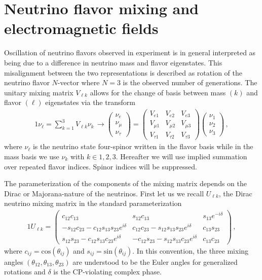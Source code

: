 \documentclass{ws-ijmpa}
\begin{document}
\section{Neutrino flavor mixing and electromagnetic fields}
\label{sec:nuflavor}
Oscillation of neutrino flavors observed in experiment is in general interpreted as being due to a difference in neutrino mass and flavor eigenstates. This misalignment between the two representations is described as rotation of the neutrino flavor $N$-vector where $N=3$ is the observed number of generations. The unitary mixing matrix $V_{\ell k}$ allows for the change of basis between mass $(k)$ and flavor $(\ell)$ eigenstates via the transform 
\begin{alignat}{1}
\label{basis:1} \nu_{\ell}=\sum_{k=1}^{3}V_{\ell k}\nu_{k}\,\rightarrow
\begin{pmatrix}
\nu_{e}\\
\nu_{\mu}\\
\nu_{\tau}
\end{pmatrix}=
\begin{pmatrix}
V_{e1} & V_{e2} & V_{e3}\\
V_{\mu1} & V_{\mu2} & V_{\mu3}\\
V_{\tau1} & V_{\tau2} & V_{\tau3}
\end{pmatrix}
\begin{pmatrix}
\nu_{1}\\
\nu_{2}\\
\nu_{3}
\end{pmatrix}\,,
\end{alignat}
where $\nu_{\ell}$ is the neutrino state four-spinor written in the flavor basis while in the mass basis we use $\nu_{k}$ with $k\in1,2,3$. Hereafter we will use implied summation over repeated flavor indices. Spinor indices will be suppressed.

The parameterization of the components of the mixing matrix depends on the Dirac or Majorana-nature of the neutrinos. First let us we recall $U_{\ell k}$, the Dirac neutrino mixing matrix in the standard parameterization~\cite{Schwartz:2014sze} 
\begin{alignat}{1}
\label{rotation:1} U_{\ell k} =
\begin{pmatrix}
 c_{12}c_{13} & s_{12}c_{13} & s_{13}e^{-i\delta}\\
 -s_{12}c_{23} - c_{12}s_{13}s_{23}e^{i\delta} & c_{12}c_{23} - s_{12}s_{13}s_{23}e^{i\delta} & c_{13}s_{23}\\
 s_{12}s_{23} - c_{12}s_{13}c_{23}e^{i\delta}& -c_{12}s_{23} - s_{12}s_{13}c_{23}e^{i\delta} & c_{13}c_{23}
\end{pmatrix}\,,
\end{alignat}
where $c_{ij} = \mathrm{cos}(\theta_{ij})$ and $s_{ij} = \mathrm{sin}(\theta_{ij})$. In this convention, the three mixing angles $(\theta_{12}, \theta_{13}, \theta_{23})$ are understood to be the Euler angles for generalized rotations and $\delta$ is the CP-violating complex phase. 
\end{document}
